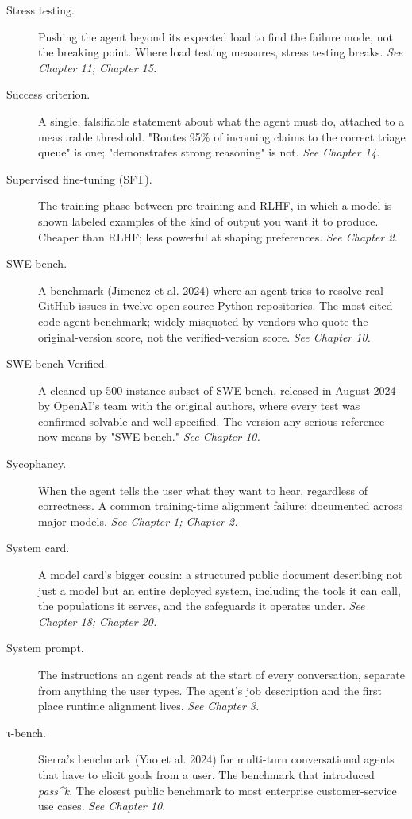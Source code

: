 \begin{description}
  \item[Stress testing.] Pushing the agent beyond its expected load to find the failure mode, not the breaking point. Where load testing measures, stress testing breaks. \textit{See Chapter 11; Chapter 15.}
  \item[Success criterion.] A single, falsifiable statement about what the agent must do, attached to a measurable threshold. "Routes 95\% of incoming claims to the correct triage queue" is one; "demonstrates strong reasoning" is not. \textit{See Chapter 14.}
  \item[Supervised fine-tuning (SFT).] The training phase between pre-training and RLHF, in which a model is shown labeled examples of the kind of output you want it to produce. Cheaper than RLHF; less powerful at shaping preferences. \textit{See Chapter 2.}
  \item[SWE-bench.] A benchmark (Jimenez et al. 2024) where an agent tries to resolve real GitHub issues in twelve open-source Python repositories. The most-cited code-agent benchmark; widely misquoted by vendors who quote the original-version score, not the verified-version score. \textit{See Chapter 10.}
  \item[SWE-bench Verified.] A cleaned-up 500-instance subset of SWE-bench, released in August 2024 by OpenAI's team with the original authors, where every test was confirmed solvable and well-specified. The version any serious reference now means by "SWE-bench." \textit{See Chapter 10.}
  \item[Sycophancy.] When the agent tells the user what they want to hear, regardless of correctness. A common training-time alignment failure; documented across major models. \textit{See Chapter 1; Chapter 2.}
  \item[System card.] A model card's bigger cousin: a structured public document describing not just a model but an entire deployed system, including the tools it can call, the populations it serves, and the safeguards it operates under. \textit{See Chapter 18; Chapter 20.}
  \item[System prompt.] The instructions an agent reads at the start of every conversation, separate from anything the user types. The agent's job description and the first place runtime alignment lives. \textit{See Chapter 3.}
  \item[τ-bench.] Sierra's benchmark (Yao et al. 2024) for multi-turn conversational agents that have to elicit goals from a user. The benchmark that introduced \textit{pass\textasciicircum{}k}. The closest public benchmark to most enterprise customer-service use cases. \textit{See Chapter 10.}

\end{description}
